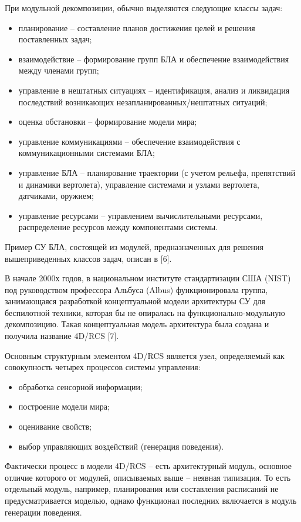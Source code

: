 \documentclass{svjour3}                     %
\begin{document}
При модульной декомпозиции, обычно выделяются следующие классы задач:
\begin{itemize}
	\item планирование – составление планов достижения целей и решения поставленных задач;
	\item взаимодействие – формирование групп БЛА и обеспечение взаимодействия между членами групп;
	\item управление в нештатных ситуациях – идентификация, анализ и ликвидация последствий возникающих незапланированных/нештатных ситуаций;
	\item оценка обстановки  – формирование модели мира;
	\item управление коммуникациями  – обеспечение взаимодействия с коммуникационными системами БЛА;
	\item управление БЛА – планирование траектории (с учетом рельефа, препятствий и динамики вертолета), управление системами и узлами вертолета, датчиками, оружием;
	\item управление ресурсами – управлением вычислительными ресурсами, распределение ресурсов между компонентами системы.
\end{itemize}

Пример СУ БЛА, состоящей из модулей, предназначенных для решения вышеприведенных классов задач, описан в [6].

В начале 2000х годов, в национальном институте стандартизации США (NIST) под руководством профессора Альбуса (Albus) функционировала группа, занимающаяся разработкой концептуальной модели архитектуры СУ для беспилотной техники, которая бы не опиралась на функционально-модульную декомпозицию. Такая концептуальная модель архитектура была создана и получила название 4D/RCS [7].

Основным структурным элементом 4D/RCS является узел, определяемый как совокупность четырех процессов системы управления:
\begin{itemize}
	\item обработка сенсорной информации;
	\item построение модели мира;
	\item оценивание свойств;
	\item выбор управляющих воздействий (генерация поведения).
\end{itemize}

Фактически процесс в модели 4D/RCS – есть архитектурный модуль, основное отличие которого от модулей, описываемых выше – неявная типизация. То есть отдельный модуль, например, планирования или составления расписаний не предусматривается моделью, однако функционал последних включается в модуль генерации поведения.
\end{document}
